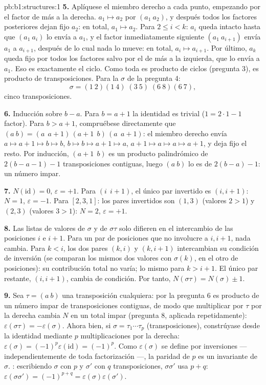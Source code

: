 \begin{solution}{pb:b1:structures:1}
\textbf{5.} Aplíquese el miembro derecho a cada punto, empezando por el
factor de más a la derecha. $a_1 \mapsto a_2$ por $(a_1\ a_2)$, y
después todos los factores posteriores dejan fijo $a_2$: en total,
$a_1 \mapsto a_2$. Para $2 \leq i < k$: $a_i$ queda intacto hasta que
$(a_1\ a_i)$ lo envía a $a_1$, y el factor inmediatamente siguiente
$(a_1\ a_{i+1})$ envía $a_1$ a $a_{i+1}$, después de lo cual nada lo
mueve: en total, $a_i \mapsto a_{i+1}$. Por último, $a_k$ queda fijo
por todos los factores salvo por el de más a la izquierda, que lo
envía a $a_1$. Eso es exactamente el ciclo. Como toda  es
producto de ciclos (pregunta 3), es producto de transposiciones. Para
la $\sigma$ de la pregunta 4:
\[
\sigma = (1\ 2)(1\ 4)\;(3\ 5)\;(6\ 8)(6\ 7),
\]
cinco transposiciones.

\textbf{6.} Inducción sobre $b - a$. Para $b = a + 1$ la identidad es
trivial ($1 = 2\cdot1 - 1$ factor). Para $b > a + 1$, compruébese
directamente que $(a\ b) = (a\ \ a{+}1)\,(a{+}1\ \ b)\,(a\ \ a{+}1)$:
el miembro derecho envía $a \mapsto a{+}1 \mapsto b \mapsto b$,
$b \mapsto b \mapsto a{+}1 \mapsto a$,
$a{+}1 \mapsto a \mapsto a \mapsto a{+}1$, y deja fijo el resto. Por
inducción, $(a{+}1\ \ b)$ es un producto palindrómico de
$2(b - a - 1) - 1$ transposiciones contiguas, luego $(a\ b)$ lo es de
$2(b - a) - 1$: un número impar.

\textbf{7.} $N(\mathrm{id}) = 0$, $\varepsilon = +1$. Para
$(i\ \ i{+}1)$, el único par invertido es $(i, i+1)$: $N = 1$,
$\varepsilon = -1$. Para $[2, 3, 1]$: los pares invertidos son
$(1, 3)$ (valores $2 > 1$) y $(2, 3)$ (valores $3 > 1$): $N = 2$,
$\varepsilon = +1$.

\textbf{8.} Las listas de valores de $\sigma$ y de $\sigma\tau$ solo
difieren en el intercambio de las posiciones $i$ e $i + 1$. Para un par
de posiciones que no involucre a $i, i+1$, nada cambia. Para $k < i$,
los dos pares $(k, i)$ y $(k, i+1)$ intercambian su condición de
inversión (se comparan los mismos dos valores con $\sigma(k)$, en el
otro  de posiciones): su contribución total no varía; lo mismo
para $k > i + 1$. El único par restante, $(i, i+1)$, cambia de
condición. Por tanto, $N(\sigma\tau) = N(\sigma) \pm 1$.

\textbf{9.} Sea $\tau = (a\ b)$ una transposición cualquiera: por la
pregunta 6 es producto de un número impar de transposiciones
contiguas, de modo que multiplicar por $\tau$ por la derecha cambia
$N$ en un total impar (pregunta 8, aplicada repetidamente):
$\varepsilon(\sigma \tau) = -\varepsilon(\sigma)$. Ahora bien, si
$\sigma = \tau_1\cdots \tau_p$ (transposiciones), constrúyase desde la
identidad mediante $p$ multiplicaciones por la derecha:
$\varepsilon(\sigma) = (-1)^p\varepsilon(\mathrm{id}) = (-1)^p$. Como
$\varepsilon(\sigma)$ se define por inversiones ---
independientemente de toda factorización ---, la paridad de $p$ es un
invariante de $\sigma$. : escribiendo $\sigma$ con $p$ y
$\sigma'$ con $q$ transposiciones, $\sigma\sigma'$ usa $p + q$:
$\varepsilon(\sigma\sigma') = (-1)^{p+q} =
\varepsilon(\sigma)\varepsilon(\sigma')$.


\end{solution}

